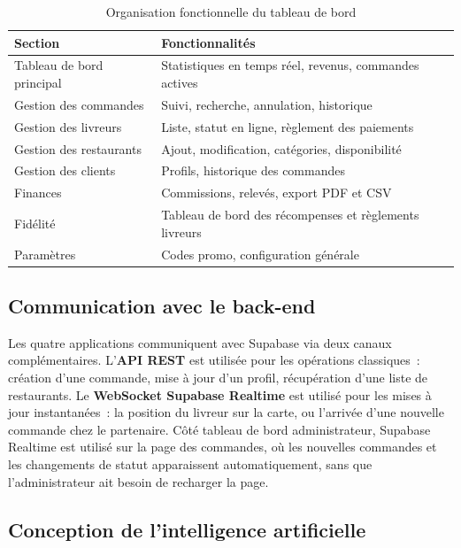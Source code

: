 \documentclass[12pt,fleqn,a4paper]{report}
\begin{document}
\begin{justify}
\begin{table}[H]
\centering
\renewcommand{\arraystretch}{1.4}
\begin{tabular}{|l|l|}
\hline
\textbf{Section} & \textbf{Fonctionnalités} \\
\hline
Tableau de bord principal & Statistiques en temps réel, revenus, commandes actives \\
\hline
Gestion des commandes & Suivi, recherche, annulation, historique \\
\hline
Gestion des livreurs & Liste, statut en ligne, règlement des paiements \\
\hline
Gestion des restaurants & Ajout, modification, catégories, disponibilité \\
\hline
Gestion des clients & Profils, historique des commandes \\
\hline
Finances & Commissions, relevés, export PDF et CSV \\
\hline
Fidélité & Tableau de bord des récompenses et règlements livreurs \\
\hline
Paramètres & Codes promo, configuration générale \\
\hline
\end{tabular}
\caption{Organisation fonctionnelle du tableau de bord}
\label{tab:pages_admin}
\end{table}

\subsection{Communication avec le back-end}

Les quatre applications communiquent avec Supabase via deux canaux complémentaires. L'\textbf{API REST} est utilisée pour les opérations classiques~: création d'une commande, mise à jour d'un profil, récupération d'une liste de restaurants. Le \textbf{WebSocket Supabase Realtime} est utilisé pour les mises à jour instantanées~: la position du livreur sur la carte, ou l'arrivée d'une nouvelle commande chez le partenaire. Côté tableau de bord administrateur, Supabase Realtime est utilisé sur la page des commandes, où les nouvelles commandes et les changements de statut apparaissent automatiquement, sans que l'administrateur ait besoin de recharger la page.

\subsection{Conception de l'intelligence artificielle}
\label{sec:conception_ia}


\end{justify}
\end{document}

